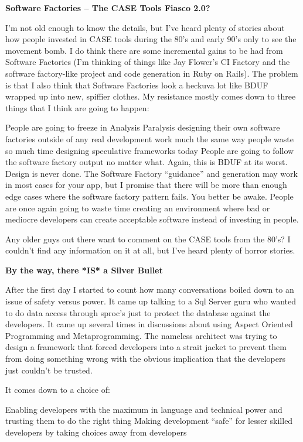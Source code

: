 \documentclass{article}
\begin{document}
\Large {\textbf {Software Factories – The CASE Tools Fiasco 2.0?}

I'm not old enough to know the details, but I've heard plenty of stories about how people invested in CASE tools during the 80's and early 90's only to see the movement bomb.  I do think there are some incremental gains to be had from Software Factories (I'm thinking of things like Jay Flower's CI Factory  and the software factory-like project and code generation in Ruby on Rails).  The problem is that I also think that Software Factories look a heckuva lot like BDUF wrapped up into new, spiffier clothes.  My resistance mostly comes down to three things that I think are going to happen:

    People are going to freeze in Analysis Paralysis designing their own software factories outside of any real development work much the same way people waste so much time designing speculative frameworks today
    People are going to follow the software factory output no matter what.  Again, this is BDUF at its worst.  Design is never done.  The Software Factory “guidance” and generation may work in most cases for your app, but I promise that there will be more than enough edge cases where the software factory pattern fails.  You better be awake.
    People are once again going to waste time creating an environment where bad or mediocre developers can create acceptable software instead of investing in people.

Any older guys out there want to comment on the CASE tools from the 80's?  I couldn't find any information on it at all, but I've heard plenty of horror stories.

 
\Large {\textbf {By the way, there *IS* a Silver Bullet}}

After the first day I started to count how many conversations boiled down to an issue of safety versus power.  It came up talking to a Sql Server guru who wanted to do data access through sproc's just to protect the database against the developers.  It came up several times in discussions about using Aspect Oriented Programming and Metaprogramming.  The nameless architect was trying to design a framework that forced developers into a strait jacket to prevent them from doing something wrong with the obvious implication that the developers just couldn't be trusted.

It comes down to a choice of:

    Enabling developers with the maximum in language and technical power and trusting them to do the right thing
    Making development “safe” for lesser skilled developers by taking choices away from developers

}
\end{document}
